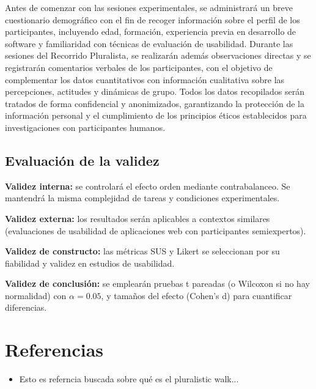 \documentclass[a4paper,12pt]{report}
\begin{document}
Antes de comenzar con las sesiones experimentales, se administrará un breve cuestionario demográfico con el fin de recoger información sobre el perfil de los participantes, incluyendo 
edad, formación, experiencia previa en desarrollo de software y familiaridad con técnicas de evaluación de usabilidad. Durante las 
sesiones del Recorrido Pluralista, se realizarán además observaciones directas y se registrarán comentarios verbales de los participantes, con el objetivo 
de complementar los datos cuantitativos con información cualitativa sobre las percepciones, actitudes y dinámicas de grupo. Todos los datos recopilados 
serán tratados de forma confidencial y anonimizados, garantizando la protección de la información personal y el cumplimiento de los principios éticos establecidos
para investigaciones con participantes humanos.





\section{Evaluación de la validez}

\textbf{Validez interna:} se controlará el efecto orden mediante contrabalanceo. Se mantendrá la misma complejidad de tareas y condiciones experimentales.  

\textbf{Validez externa:} los resultados serán aplicables a contextos similares (evaluaciones de usabilidad de aplicaciones web con participantes semiexpertos).  

\textbf{Validez de constructo:} las métricas SUS y Likert se seleccionan por su fiabilidad y validez en estudios de usabilidad.  

\textbf{Validez de conclusión:} se emplearán pruebas t pareadas (o Wilcoxon si no hay normalidad) con $\alpha=0.05$, y tamaños del efecto (Cohen’s d) para cuantificar diferencias.

\chapter*{Referencias}
\begin{itemize}
	\item Esto es referncia buscada sobre qué es el pluralistic walk...\cite{PluralisticWalkthrough}
\end{itemize}
\end{document}
